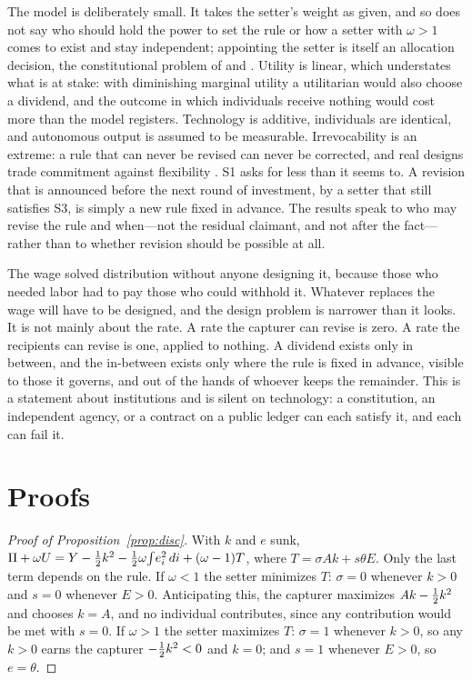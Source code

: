 The model is deliberately small. It takes the setter's weight as given, and so does not
say who should hold the power to set the rule or how a setter with $\omega>1$ comes to
exist and stay independent; appointing the setter is itself an allocation decision, the
constitutional problem of \citet{BrennanBuchanan1980} and
\citet{PerssonRolandTabellini1997}. Utility is linear, which understates what is at
stake: with diminishing marginal utility a utilitarian would also choose a dividend, and
the outcome in which individuals receive nothing would cost more than the model
registers. Technology is additive, individuals are identical, and autonomous output is
assumed to be measurable. Irrevocability is an extreme: a rule that can never be revised
can never be corrected, and real designs trade commitment against flexibility
\citep{Rogoff1985}. S1 asks for less than it seems to. A revision that is announced before
the next round of investment, by a setter that still satisfies S3, is simply a new rule
fixed in advance. The results speak to who may revise the rule and when---not the residual
claimant, and not after the fact---rather than to whether revision should be possible at
all.

The wage solved distribution without anyone designing it, because those who needed labor
had to pay those who could withhold it. Whatever replaces the wage will have to be
designed, and the design problem is narrower than it looks. It is not mainly about the
rate. A rate the capturer can revise is zero. A rate the recipients can revise is one,
applied to nothing. A dividend exists only in between, and the in-between exists only
where the rule is fixed in advance, visible to those it governs, and out of the hands of
whoever keeps the remainder. This is a statement about institutions and is silent on
technology: a constitution, an independent agency, or a contract on a public ledger can
each satisfy it, and each can fail it.


\appendix
\section{Proofs}

\begin{proof}[Proof of Proposition~\ref{prop:disc}]
With $k$ and $e$ sunk, $\Pi+\omega U=Y-\tfrac{1}{2} k^2-\tfrac{1}{2}\omega\!\int\! e_i^2\,di+(\omega-1)T$,
where $T=\sigma Ak+s\theta E$. Only the last term depends on the rule. If $\omega<1$ the
setter minimizes $T$: $\sigma=0$ whenever $k>0$ and $s=0$ whenever $E>0$. Anticipating
this, the capturer maximizes $Ak-\tfrac{1}{2} k^2$ and chooses $k=A$, and no individual
contributes, since any contribution would be met with $s=0$. If $\omega>1$ the setter
maximizes $T$: $\sigma=1$ whenever $k>0$, so any $k>0$ earns the capturer $-\tfrac{1}{2} k^2<0$
and $k=0$; and $s=1$ whenever $E>0$, so $e=\theta$.
\end{proof}

